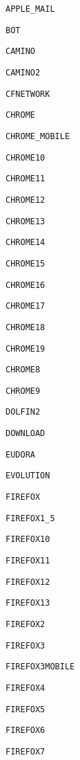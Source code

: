 \documentclass[11pt,a4paper,titlepage]{article}
\begin{document}
\begin{multicols}{4}

    \small \texttt{APPLE\_MAIL}

    \small \texttt{BOT}

    \small \texttt{CAMINO}

    \small \texttt{CAMINO2}

    \small \texttt{CFNETWORK}

    \small \texttt{CHROME}

    \small \texttt{CHROME\_MOBILE}

    \small \texttt{CHROME10}

    \small \texttt{CHROME11}

    \small \texttt{CHROME12}

    \small \texttt{CHROME13}

    \small \texttt{CHROME14}

    \small \texttt{CHROME15}

    \small \texttt{CHROME16}

    \small \texttt{CHROME17}

    \small \texttt{CHROME18}

    \small \texttt{CHROME19}

    \small \texttt{CHROME8}

    \small \texttt{CHROME9}

    \small \texttt{DOLFIN2}

    \small \texttt{DOWNLOAD}

    \small \texttt{EUDORA}

    \small \texttt{EVOLUTION}

    \small \texttt{FIREFOX}

    \small \texttt{FIREFOX1\_5}

    \small \texttt{FIREFOX10}

    \small \texttt{FIREFOX11}

    \small \texttt{FIREFOX12}

    \small \texttt{FIREFOX13}

    \small \texttt{FIREFOX2}

    \small \texttt{FIREFOX3}

    \small \texttt{FIREFOX3MOBILE}

    \small \texttt{FIREFOX4}

    \small \texttt{FIREFOX5}

    \small \texttt{FIREFOX6}

    \small \texttt{FIREFOX7}


\end{multicols}
\end{document}
